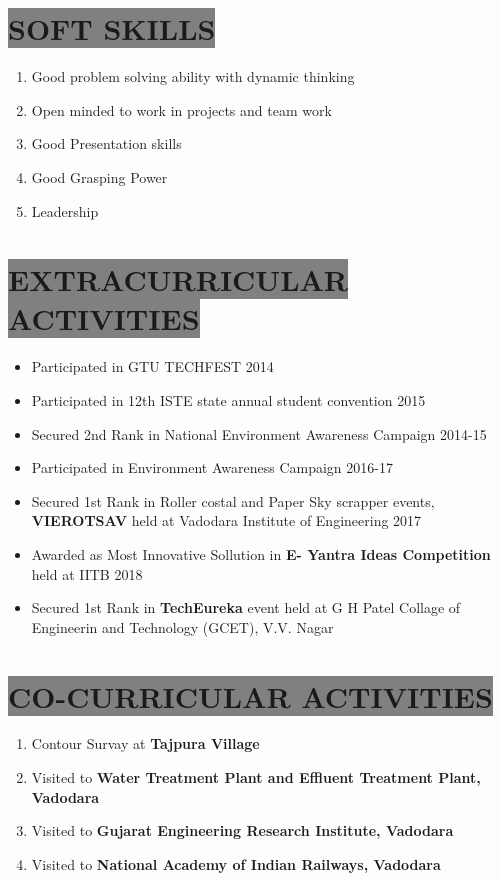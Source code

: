 \documentclass{res}
\begin{document}
\begin{resume}
\begin{itemize}
 \end{itemize}



 
\section{
\colorbox{grey}{SOFT SKILLS}          
}
    \begin{enumerate} 
 \item Good problem solving ability with dynamic thinking
 \item Open minded to work in projects and team work
 \item Good Presentation skills
 \item Good Grasping Power
 \item Leadership
 \end{enumerate}




\section{
\colorbox{grey}{EXTRACURRICULAR ACTIVITIES}          
}
\begin{itemize} 
 \item Participated in GTU TECHFEST 2014
 \item Participated in 12th ISTE state annual student convention 2015
 \item Secured 2nd Rank in National Environment Awareness Campaign 2014-15
 \item Participated in Environment Awareness Campaign 2016-17
 \item Secured 1st Rank in Roller costal and Paper Sky scrapper events, \textbf{VIEROTSAV} held at Vadodara Institute of Engineering 2017
 \item Awarded as Most Innovative Sollution in \textbf{E- Yantra Ideas Competition} held at IITB 2018
 \item Secured 1st Rank in \textbf{TechEureka} event held at G H Patel Collage of Engineerin and Technology (GCET), V.V. Nagar
 \end{itemize}





\section{
\colorbox{grey}{CO-CURRICULAR ACTIVITIES} 
}         
\begin{enumerate} 
 \item Contour Survay at \textbf{Tajpura Village}
 \item Visited to \textbf{ Water Treatment Plant and Effluent Treatment Plant, Vadodara}
\item Visited to \textbf{ Gujarat Engineering Research Institute, Vadodara}
\item Visited to \textbf{ National Academy of Indian Railways, Vadodara }
 \end{enumerate}




\end{resume}
\end{document}
